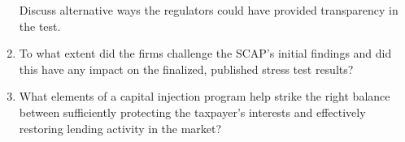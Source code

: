 \documentclass[justified, nobib]{tufte-handout2}
\begin{document}
\begin{enumerate}
  Discuss alternative ways the regulators could have provided
  transparency in the test.
\item
  To what extent did the firms challenge the SCAP's initial findings and
  did this have any impact on the finalized, published stress test
  results?
\item
  What elements of a capital injection program help strike the right
  balance between sufficiently protecting the taxpayer's interests and
  effectively restoring lending activity in the market?
\end{enumerate}
\end{document}

